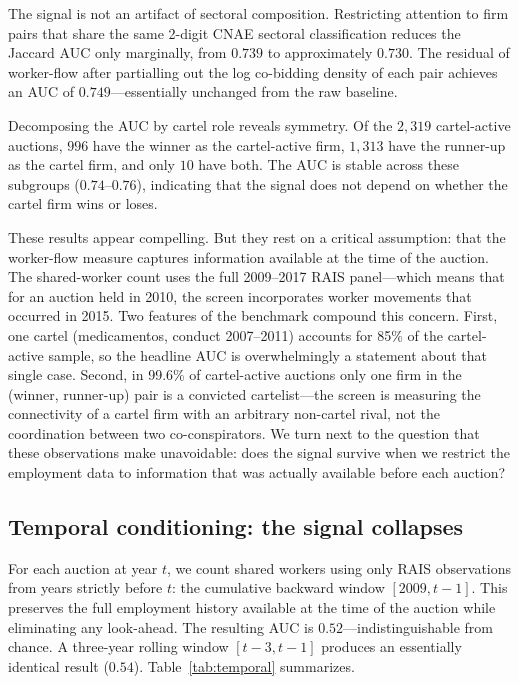 The signal is not an artifact of sectoral composition. Restricting attention to firm pairs that share the same 2-digit CNAE sectoral classification reduces the Jaccard AUC only marginally, from $0.739$ to approximately $0.730$. The residual of worker-flow after partialling out the log co-bidding density of each pair achieves an AUC of $0.749$---essentially unchanged from the raw baseline.

Decomposing the AUC by cartel role reveals symmetry. Of the $2{,}319$ cartel-active auctions, $996$ have the winner as the cartel-active firm, $1{,}313$ have the runner-up as the cartel firm, and only $10$ have both. The AUC is stable across these subgroups ($0.74$--$0.76$), indicating that the signal does not depend on whether the cartel firm wins or loses.

These results appear compelling. But they rest on a critical assumption: that the worker-flow measure captures information available at the time of the auction. The shared-worker count uses the full 2009--2017 RAIS panel---which means that for an auction held in 2010, the screen incorporates worker movements that occurred in 2015. Two features of the benchmark compound this concern. First, one cartel (medicamentos, conduct 2007--2011) accounts for 85\% of the cartel-active sample, so the headline AUC is overwhelmingly a statement about that single case. Second, in 99.6\% of cartel-active auctions only one firm in the (winner, runner-up) pair is a convicted cartelist---the screen is measuring the connectivity of a cartel firm with an arbitrary non-cartel rival, not the coordination between two co-conspirators. We turn next to the question that these observations make unavoidable: does the signal survive when we restrict the employment data to information that was actually available before each auction?


\subsection{Temporal conditioning: the signal collapses}\label{sec:temporal}

For each auction at year $t$, we count shared workers using only RAIS observations from years strictly before $t$: the cumulative backward window $[2009, t-1]$. This preserves the full employment history available at the time of the auction while eliminating any look-ahead. The resulting AUC is $0.52$---indistinguishable from chance. A three-year rolling window $[t-3, t-1]$ produces an essentially identical result ($0.54$). Table~\ref{tab:temporal} summarizes.


